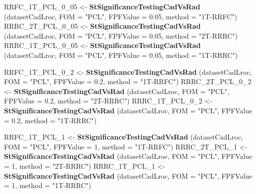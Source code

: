 \documentclass[
]{book}
\newenvironment{Shaded}{\begin{snugshade}}{\end{snugshade}}
\newcommand{\DataTypeTok}[1]{\textcolor[rgb]{0.13,0.29,0.53}{#1}}
\newcommand{\DecValTok}[1]{\textcolor[rgb]{0.00,0.00,0.81}{#1}}
\newcommand{\FloatTok}[1]{\textcolor[rgb]{0.00,0.00,0.81}{#1}}
\newcommand{\KeywordTok}[1]{\textcolor[rgb]{0.13,0.29,0.53}{\textbf{#1}}}
\newcommand{\NormalTok}[1]{#1}
\newcommand{\StringTok}[1]{\textcolor[rgb]{0.31,0.60,0.02}{#1}}
\begin{document}
\begin{Shaded}
\begin{Highlighting}[]
\NormalTok{RRFC_1T_PCL_}\DecValTok{0}\NormalTok{_}\DecValTok{05}\NormalTok{ <-}\StringTok{ }\KeywordTok{StSignificanceTestingCadVsRad}\NormalTok{ (datasetCadLroc, }
\DataTypeTok{FOM =} \StringTok{"PCL"}\NormalTok{, }\DataTypeTok{FPFValue =} \FloatTok{0.05}\NormalTok{, }\DataTypeTok{method =} \StringTok{"1T-RRFC"}\NormalTok{)}
\NormalTok{RRRC_2T_PCL_}\DecValTok{0}\NormalTok{_}\DecValTok{05}\NormalTok{ <-}\StringTok{ }\KeywordTok{StSignificanceTestingCadVsRad}\NormalTok{ (datasetCadLroc, }
\DataTypeTok{FOM =} \StringTok{"PCL"}\NormalTok{, }\DataTypeTok{FPFValue =} \FloatTok{0.05}\NormalTok{, }\DataTypeTok{method =} \StringTok{"2T-RRRC"}\NormalTok{)}
\NormalTok{RRRC_1T_PCL_}\DecValTok{0}\NormalTok{_}\DecValTok{05}\NormalTok{ <-}\StringTok{ }\KeywordTok{StSignificanceTestingCadVsRad}\NormalTok{ (datasetCadLroc, }
\DataTypeTok{FOM =} \StringTok{"PCL"}\NormalTok{, }\DataTypeTok{FPFValue =} \FloatTok{0.05}\NormalTok{, }\DataTypeTok{method =} \StringTok{"1T-RRRC"}\NormalTok{)}

\NormalTok{RRFC_1T_PCL_}\DecValTok{0}\NormalTok{_}\DecValTok{2}\NormalTok{ <-}\StringTok{ }\KeywordTok{StSignificanceTestingCadVsRad}\NormalTok{ (datasetCadLroc, }
\DataTypeTok{FOM =} \StringTok{"PCL"}\NormalTok{, }\DataTypeTok{FPFValue =} \FloatTok{0.2}\NormalTok{, }\DataTypeTok{method =} \StringTok{"1T-RRFC"}\NormalTok{)}
\NormalTok{RRRC_2T_PCL_}\DecValTok{0}\NormalTok{_}\DecValTok{2}\NormalTok{ <-}\StringTok{ }\KeywordTok{StSignificanceTestingCadVsRad}\NormalTok{ (datasetCadLroc, }
\DataTypeTok{FOM =} \StringTok{"PCL"}\NormalTok{, }\DataTypeTok{FPFValue =} \FloatTok{0.2}\NormalTok{, }\DataTypeTok{method =} \StringTok{"2T-RRRC"}\NormalTok{)}
\NormalTok{RRRC_1T_PCL_}\DecValTok{0}\NormalTok{_}\DecValTok{2}\NormalTok{ <-}\StringTok{ }\KeywordTok{StSignificanceTestingCadVsRad}\NormalTok{ (datasetCadLroc, }
\DataTypeTok{FOM =} \StringTok{"PCL"}\NormalTok{, }\DataTypeTok{FPFValue =} \FloatTok{0.2}\NormalTok{, }\DataTypeTok{method =} \StringTok{"1T-RRRC"}\NormalTok{)}

\NormalTok{RRFC_1T_PCL_}\DecValTok{1}\NormalTok{ <-}\StringTok{ }\KeywordTok{StSignificanceTestingCadVsRad}\NormalTok{ (datasetCadLroc, }
\DataTypeTok{FOM =} \StringTok{"PCL"}\NormalTok{, }\DataTypeTok{FPFValue =} \DecValTok{1}\NormalTok{, }\DataTypeTok{method =} \StringTok{"1T-RRFC"}\NormalTok{)}
\NormalTok{RRRC_2T_PCL_}\DecValTok{1}\NormalTok{ <-}\StringTok{ }\KeywordTok{StSignificanceTestingCadVsRad}\NormalTok{ (datasetCadLroc, }
\DataTypeTok{FOM =} \StringTok{"PCL"}\NormalTok{, }\DataTypeTok{FPFValue =} \DecValTok{1}\NormalTok{, }\DataTypeTok{method =} \StringTok{"2T-RRRC"}\NormalTok{)}
\NormalTok{RRRC_1T_PCL_}\DecValTok{1}\NormalTok{ <-}\StringTok{ }\KeywordTok{StSignificanceTestingCadVsRad}\NormalTok{ (datasetCadLroc, }
\DataTypeTok{FOM =} \StringTok{"PCL"}\NormalTok{, }\DataTypeTok{FPFValue =} \DecValTok{1}\NormalTok{, }\DataTypeTok{method =} \StringTok{"1T-RRRC"}\NormalTok{)}


\end{Highlighting}
\end{Shaded}
\end{document}
